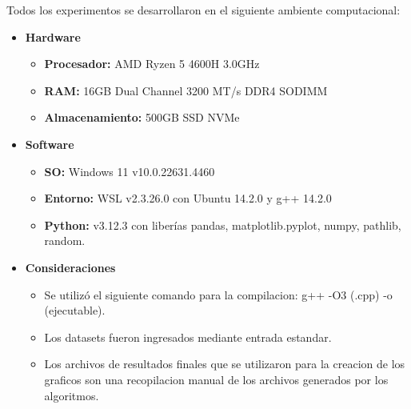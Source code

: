 Todos los experimentos se desarrollaron en el siguiente ambiente computacional:

\begin{itemize}
    \item \textbf{Hardware}
    \begin{itemize}
        \item \textbf{Procesador:} AMD Ryzen 5 4600H 3.0GHz
        \item \textbf{RAM:} 16GB Dual Channel 3200 MT/s DDR4 SODIMM
        \item \textbf{Almacenamiento:} 500GB SSD NVMe
    \end{itemize}
    \item \textbf{Software}
    \begin{itemize}
        \item \textbf{SO:} Windows 11 v10.0.22631.4460
        \item \textbf{Entorno:} WSL v2.3.26.0 con Ubuntu 14.2.0 y g++ 14.2.0
        \item \textbf{Python:} v3.12.3 con liberías pandas, matplotlib.pyplot, numpy, pathlib, random.
    \end{itemize}
    \item \textbf{Consideraciones}
    \begin{itemize}
        \item Se utilizó el siguiente comando para la compilacion: g++ -O3 (.cpp) -o (ejecutable).
        \item Los datasets fueron ingresados mediante entrada estandar.
        \item Los archivos de resultados finales que se utilizaron para la creacion de los graficos son una recopilacion manual de los archivos generados 
        por los algoritmos.
    \end{itemize}
\end{itemize}
